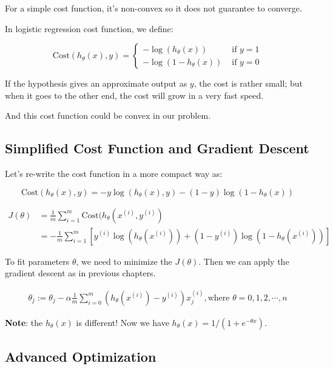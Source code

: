\documentclass[black,simple]{../elegantbook}
\begin{document}
For a simple cost function, it's non-convex so it does not guarantee to converge.

In logistic regression cost function, we define:

\[
\text{Cost}\left(h_\theta(x), y\right) = \left\{
\begin{aligned}
    - \log (h_\theta(x)) & \text{ if } y = 1\\
    - \log (1 - h_\theta(x)) & \text{ if } y = 0
\end{aligned}    
\right.
\]

If the hypothesis gives an approximate output as \(y\), the cost is rather small; but when it goes to the other end, the cost will grow in a very fast speed.

And this cost function could be convex in our problem.

\subsection{Simplified Cost Function and Gradient Descent}

Let's re-write the cost function in a more compact way as: 

\[\text{Cost}\left(h_\theta(x), y\right) = -y \log (h_\theta(x), y) - (1-y) \log (1-h_\theta(x))\]

\[
\begin{aligned}
    J(\theta) &= \frac{1}{m} \sum_{i = 1}^m \text{Cost} (h_\theta(x^{(i)}, y^{(i)}) \\
    &=  -\frac{1}{m}\sum_{i=1}^m\left[y^{(i)} \log (h_\theta(x^{(i)})) + (1-y^{(i)}) \log (1-h_\theta(x^{(i)}))\right]
\end{aligned}    
\]

To fit parameters \(\theta\), we need to minimize the \(J(\theta)\). Then we can apply the gradient descent as in previous chapters.


\[\begin{aligned}
    \theta_j := \theta_j - \alpha \frac{1}{m} \sum_{i = 0}^m (h_\theta(x^{(i)}) - y^{(i)})x_j^{(i)}, \text{where } \theta = 0, 1, 2, \cdots , n
\end{aligned}\]

\textbf{Note}: the \(h_\theta(x)\) is different! Now we have \(h_\theta(x) = 1 / (1 + e^{-\theta x})\).

\subsection{Advanced Optimization}
\end{document}
